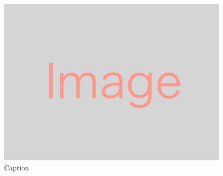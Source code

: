 \begin{figure}[b]
  \centering
  \includegraphics[width=0.5\linewidth]{img/img.png}
  \caption{Caption}
  \label{fig_label}
\end{figure}

